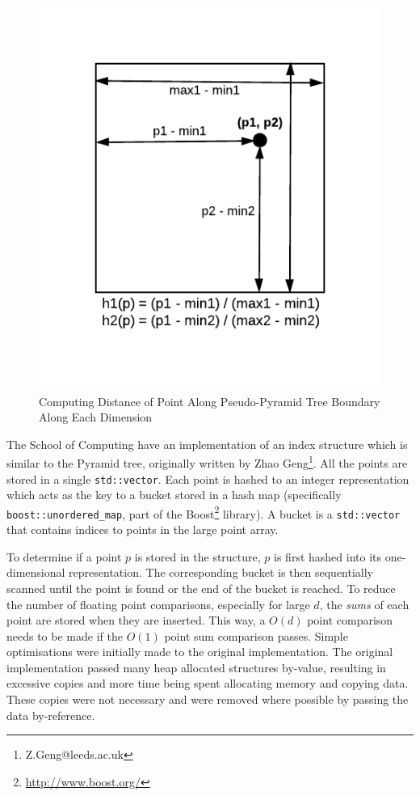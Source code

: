 \begin{figure}
	\vspace{-40pt}
	\begin{center}
		\includegraphics[scale=0.6]{figures/pseudo-pyramid_tree_point_boundary_distances.pdf}
	\end{center}
	\vspace{-20pt}
	\caption{Computing Distance of Point Along Pseudo-Pyramid Tree Boundary Along Each Dimension}
	\label{fig:point-boundary-distance}
\end{figure}

The School of Computing have an implementation of an index structure which is similar to the Pyramid tree, originally written by Zhao Geng\footnote{Z.Geng@leeds.ac.uk}. All the points are stored in a single \texttt{std::vector}. Each point is hashed to an integer representation which acts as the key to a bucket stored in a hash map (specifically \texttt{boost::unordered\_map}, part of the Boost\footnote{\url{http://www.boost.org/}} library). A bucket is a \texttt{std::vector} that contains indices to points in the large point array.

To determine if a point $p$ is stored in the structure, $p$ is first hashed into its one-dimensional representation. The corresponding bucket is then sequentially scanned until the point is found or the end of the bucket is reached. To reduce the number of floating point comparisons, especially for large $d$, the \textit{sums} of each point are stored when they are inserted. This way, a $O(d)$ point comparison needs to be made if the $O(1)$ point sum comparison passes. Simple optimisations were initially made to the original implementation. The original implementation passed many heap allocated structures by-value, resulting in excessive copies and more time being spent allocating memory and copying data. These copies were not necessary and were removed where possible by passing the data by-reference.

